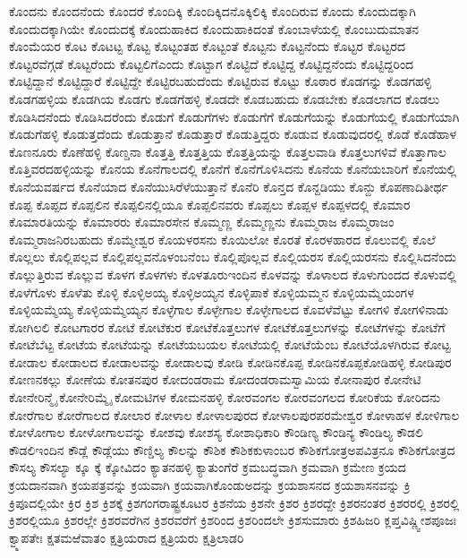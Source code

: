 {ಕೊಂದನು
ಕೊಂದನೆಂದು
ಕೊಂದರೆ
ಕೊಂದಿಕ್ಕಿ
ಕೊಂದಿಕ್ಕಿದನೊಕ್ಕಿಲಿಕ್ಕಿ
ಕೊಂದಿರುವ
ಕೊಂದು
ಕೊಂದುದಕ್ಕಾಗಿ
ಕೊಂದುದಕ್ಕಾಗಿಯೇ
ಕೊಂದುದಕ್ಕೆ
ಕೊಂದುಹಾಕಿದ
ಕೊಂದುಹಾಕಿದಂತೆ
ಕೊಂಬಾಳೆಯಲ್ಲಿ
ಕೊಂಬುದುಮಾತನ
ಕೊಂಮೆಯರ
ಕೊಟ
ಕೊಟಟ್ಟ
ಕೊಟ್ಟ
ಕೊಟ್ಟಂತಹ
ಕೊಟ್ಟಂತೆ
ಕೊಟ್ಟನು
ಕೊಟ್ಟನೆಂದು
ಕೊಟ್ಟರ
ಕೊಟ್ಟರದ
ಕೊಟ್ಟರವೆಗ್ಗಡೆ
ಕೊಟ್ಟರೆಂದು
ಕೊಟ್ಟಲಿಗೆಎಂದು
ಕೊಟ್ಟಾಗ
ಕೊಟ್ಟಿದೆ
ಕೊಟ್ಟಿದ್ದ
ಕೊಟ್ಟಿದ್ದನೆಂದು
ಕೊಟ್ಟಿದ್ದರಿಂದ
ಕೊಟ್ಟಿದ್ದಾನೆ
ಕೊಟ್ಟಿದ್ದಾರೆ
ಕೊಟ್ಟಿದ್ದೇ
ಕೊಟ್ಟಿರಬಹುದೆಂದು
ಕೊಟ್ಟಿರುವ
ಕೊಟ್ಟು
ಕೊಠಾರ
ಕೊಡಗನ್ನು
ಕೊಡಗಹಳ್ಳಿ
ಕೊಡಗಹಳ್ಳಿಯ
ಕೊಡಗಿಯ
ಕೊಡಗು
ಕೊಡಗೆಹಳ್ಳಿ
ಕೊಡದೇ
ಕೊಡಬಹುದು
ಕೊಡಬೇಕು
ಕೊಡಲಾಗದ
ಕೊಡಲು
ಕೊಡಿಸಿದನೆಂದು
ಕೊಡಿಸಿದರೆಂದು
ಕೊಡುಗೆ
ಕೊಡುಗೆಗಳು
ಕೊಡುಗೆಗೆ
ಕೊಡುಗೆಯನ್ನು
ಕೊಡುಗೆಯಲ್ಲಿ
ಕೊಡುಗೆಯಾಗಿ
ಕೊಡುಗೆಹಳ್ಳಿ
ಕೊಡುತ್ತದೆಂದು
ಕೊಡುತ್ತಾನೆ
ಕೊಡುತ್ತಾರೆ
ಕೊಡುತ್ತಿದ್ದರು
ಕೊಡುವ
ಕೊಡುವುದರಲ್ಲಿ
ಕೊಡೆ
ಕೊಡೆಹಾಳ
ಕೊಣನೂರು
ಕೊಣೆಹಳ್ಳಿ
ಕೊಣ್ಡನಾ
ಕೊತ್ತತ್ತಿ
ಕೊತ್ತತ್ತಿಯ
ಕೊತ್ತತ್ತಿಯನ್ನು
ಕೊತ್ತಲವಾಡಿ
ಕೊತ್ತಲುಗಳಿವೆ
ಕೊತ್ತಾಗಾಲ
ಕೊತ್ತಿವರದಹಳ್ಳಿಯನ್ನು
ಕೊನಯ
ಕೊನೆಗಾಲದಲ್ಲಿ
ಕೊನೆಗೆ
ಕೊನೆಗೊಳಿಸಿದನು
ಕೊನೆಯ
ಕೊನೆಯಬಾರಿಗೆ
ಕೊನೆಯಲ್ಲಿ
ಕೊನೆಯವರ್ಷದ
ಕೊನೆಯಾದ
ಕೊನೆಯುಸಿರೆಳೆಯುತ್ತಾನೆ
ಕೊನೆರಿ
ಕೊನ್ತದ
ಕೊನ್ದಡಿಯು
ಕೊನ್ದು
ಕೊಪಣಾದಿತೀರ್ಥ
ಕೊಪ್ಪ
ಕೊಪ್ಪದ
ಕೊಪ್ಪಲಿನ
ಕೊಪ್ಪಲಿನಲ್ಲಿಯೂ
ಕೊಪ್ಪಲಿನವರು
ಕೊಪ್ಪಲು
ಕೊಪ್ಪಳ
ಕೊಪ್ಪಳದಲ್ಲಿ
ಕೊಮಾರ
ಕೊಮಾರತಿಯನ್ನು
ಕೊಮಾರರು
ಕೊಮಾರಸೇನ
ಕೊಮ್ಮಣ್ಣ
ಕೊಮ್ಮಣ್ಣನು
ಕೊಮ್ಮರಾಜ
ಕೊಮ್ಮರಾಜಂ
ಕೊಮ್ಮರಾಜನಿರಬಹುದು
ಕೊಮ್ಮೇಶ್ವರ
ಕೊಯಳರಸನು
ಕೊಯಿಲೋ
ಕೊರತೆ
ಕೊರಳಹಾರದ
ಕೊಲುವಲ್ಲಿ
ಕೊಲೆ
ಕೊಲ್ಲಲು
ಕೊಲ್ಲಿಪಲ್ಲವ
ಕೊಲ್ಲಿಪಲ್ಲವನೊಳಂಬನೆಂಬ
ಕೊಲ್ಲಿಪೊಲ್ಲವ
ಕೊಲ್ಲಿಯರಸ
ಕೊಲ್ಲಿಯರಸನು
ಕೊಲ್ಲಿಸಿದನೆಂದು
ಕೊಲ್ಲುತ್ತಿರುವ
ಕೊಲ್ಲುವ
ಕೊಳಗ
ಕೊಳಗಳು
ಕೊಳತೂರುಇಂದಿನ
ಕೊಳವನ್ನು
ಕೊಳಾಲದ
ಕೊಳುಗುಂದದ
ಕೊಳುವಲ್ಲಿ
ಕೊಳೆಗೊಳು
ಕೊಳೆತು
ಕೊಳ್ಳಿ
ಕೊಳ್ಳಿಅಯ್ಯ
ಕೊಳ್ಳಿಅಯ್ಯನ
ಕೊಳ್ಳಿಪಾಕೆ
ಕೊಳ್ಳಿಯಮ್ಮನ
ಕೊಳ್ಳಿಯಮ್ಮೆಯಂಗಳ
ಕೊಳ್ಳಿಯಮ್ಮೆಯ್ಯ
ಕೊಳ್ಳಿಯಮ್ಮೆಯ್ಯನ
ಕೊಳ್ಳೆಗಾಲ
ಕೊಳ್ಳೇಗಾಲ
ಕೊಳ್ಳೇಗಾಲದ
ಕೊವಳೆವೆಟ್ಟು
ಕೋಗಳಿ
ಕೋಗಳಿನಾಡು
ಕೋಗಿಲಲಿ
ಕೋಟಗಾರರ
ಕೋಟೆ
ಕೋಟೆಕುರ
ಕೋಟೆಕೊತ್ತಲುಗಳ
ಕೋಟೆಕೊತ್ತಲುಗಳನ್ನು
ಕೋಟೆಗಳನ್ನು
ಕೋಟೆಗೆ
ಕೋಟೆಬೆಟ್ಟ
ಕೋಟೆಯ
ಕೋಟೆಯನ್ನು
ಕೋಟೆಯಬಯಲ
ಕೋಟೆಯಲ್ಲಿ
ಕೋಟೆಯೆಂಬ
ಕೋಟೆಯೊಳಗಿರುವ
ಕೋಟ್ಟ
ಕೋಡಾಲ
ಕೋಡಾಲದ
ಕೋಡಾಲವನ್ನು
ಕೋಡಾಲವು
ಕೋಡಿ
ಕೋಡಿನಕೊಪ್ಪ
ಕೋಡಿನಕೊಪ್ಪಕೋಡಿಹಳ್ಳಿ
ಕೋಡಿಪುರ
ಕೋಣನಕಲ್ಲು
ಕೋಣೆಯ
ಕೋತನಪುರ
ಕೋದಂಡರಾಮ
ಕೋದಂಡರಾಮಸ್ವಾಮಿಯ
ಕೋನಾಪುರ
ಕೋನೇಟಿ
ಕೋನೇರಿನ್ಮೈ
ಕೋನೇರಿಮ್ಮೈ
ಕೋಮಟಿಗಳ
ಕೋಮನಹಳ್ಳಿ
ಕೋರವಂಗಲ
ಕೋರವಂಗಲದ
ಕೋರಿಕೆಯ
ಕೋರಿದನು
ಕೋರೆಗಾಲ
ಕೋರೆಗಾಲದ
ಕೋಲಾರ
ಕೋಳಾಲ
ಕೋಳಾಲಪುರದ
ಕೋಳಾಲಪುರಪರಮೇಶ್ವರ
ಕೋಳಾಹಳ
ಕೋಳಿಗಾಲ
ಕೋಳೋಗಾಲ
ಕೋಳೋಗಾಲವನ್ನು
ಕೋಶವು
ಕೋಶಸ್ಯ
ಕೋಶಾಧಿಕಾರಿ
ಕೌಂಡಿಣ್ಯ
ಕೌಂಡಿನ್ಯ
ಕೌಂಡಿಲ್ಯ
ಕೌಡಲಿ
ಕೌಡಲಿಇಂದಿನ
ಕೌಡ್ಲೆ
ಕೌಡ್ಲೆಯು
ಕೌಣ್ಡಿಲ್ಯ
ಕೌಲನ್ನು
ಕೌಶಿಕ
ಕೌಶಿಕಕುಳಾಂಬರ
ಕೌಶಿಕಗೋತ್ರಅಪವಿತ್ರನೂ
ಕೌಶಿಕಗೋತ್ರದ
ಕೌಸಲ್ಯ
ಕೌಸಲ್ಯಾ
ಕ್ಕೂ
ಕ್ಕೆ
ಕ್ಕೋವಿದಂ
ಕ್ಯಾತನಹಳ್ಳಿ
ಕ್ಯಾತುಂಗೆರೆ
ಕ್ರಮಬದ್ಧವಾಗಿ
ಕ್ರಮವಾಗಿ
ಕ್ರಮೇಣ
ಕ್ರಯದ
ಕ್ರಯದಾನವಾಗಿ
ಕ್ರಯಪತ್ರವನ್ನು
ಕ್ರಯವಾಗಿ
ಕ್ರಯವಾಗಿಕೊಂಡುಅದನ್ನು
ಕ್ರಯಶಾಸನದ
ಕ್ರಯಶಾಸನವನ್ನು
ಕ್ರಿ
ಕ್ರಿಪೂದಲ್ಲಿಯೇ
ಕ್ರಿರ
ಕ್ರಿಶ
ಕ್ರಿಶಕ್ಕೆ
ಕ್ರಿಶಗಂಗರಾಷ್ಟ್ರಕೂಟರ
ಕ್ರಿಶನೆಯ
ಕ್ರಿಶನೇ
ಕ್ರಿಶರ
ಕ್ರಿಶರದ್ದೇ
ಕ್ರಿಶರನಂತರ
ಕ್ರಿಶರರಲ್ಲಿ
ಕ್ರಿಶರಲ್ಲಿ
ಕ್ರಿಶರಲ್ಲಿಯೂ
ಕ್ರಿಶರಲ್ಲೇ
ಕ್ರಿಶರವರೆಗಿನ
ಕ್ರಿಶರವರೆಗೆ
ಕ್ರಿಶರಿಂದ
ಕ್ರಿಶರಿಂದಲೇ
ಕ್ರಿಶಸುಮಾರು
ಕ್ರಿಶಹಿಜರಿ
ಕ್ಲಪ್ತವಿಷ್ಣ್ವೀಶಪೂಜಃ
ಕ್ವ್ಮಾಪತೇಃ
ಕ್ಷತಮಱೆವಾತಂ
ಕ್ಷತ್ರಿಯರಾದ
ಕ್ಷತ್ರಿಯರು
ಕ್ಷತ್ರಿಲಾಡರಿ
}
